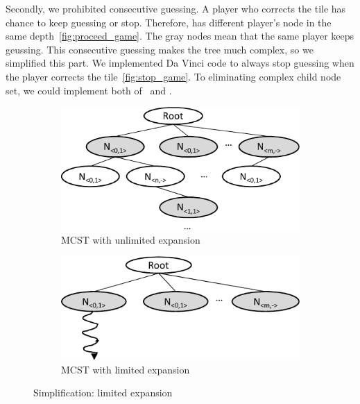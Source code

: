 Secondly, we prohibited consecutive guessing.
A player who corrects the tile has chance to keep guessing or stop.
Therefore, \md has different player's node in the same depth~\cref{fig:proceed_game}.
The gray nodes mean that the same player keeps geussing.
This consecutive guessing makes the tree much complex, so we simplified this part.
We implemented Da Vinci code to always stop guessing when the player corrects the tile~\cref{fig:stop_game}.
To eliminating complex child node set, we could implement both of \cpu~and \gpu.
 
\begin{figure}
\begin{subfigure}[b]{0.95\columnwidth}
\includegraphics [width=0.95\columnwidth]{figures/sub_compare_expansion_1.pdf}
\caption{MCST with unlimited expansion}
\label{fig:expansion}
\end{subfigure}
\par\bigskip
\begin{subfigure}[b]{0.95\columnwidth}
\includegraphics [width=0.95\columnwidth]{figures/sub_compare_expansion_2.pdf}
\caption{MCST with limited expansion}
\label{fig:limited_expansion}
\end{subfigure}
\caption{Simplification: limited expansion}
\end{figure}

